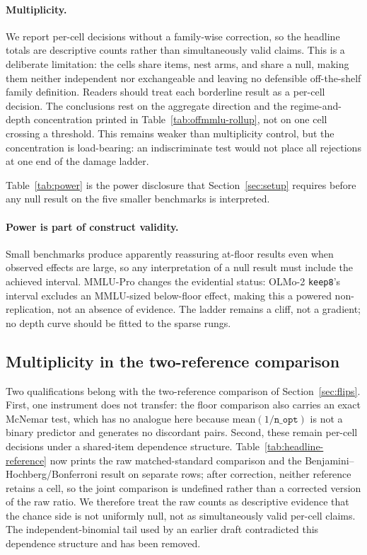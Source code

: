 \paragraph{Multiplicity.} We report per-cell decisions without a family-wise correction, so the headline totals are descriptive counts rather than simultaneously valid claims. This is a deliberate limitation: the cells share items, nest arms, and share a null, making them neither independent nor exchangeable and leaving no defensible off-the-shelf family definition. Readers should treat each borderline result as a per-cell decision. The conclusions rest on the aggregate direction and the regime-and-depth concentration printed in Table~\ref{tab:offmmlu-rollup}, not on one cell crossing a threshold. This remains weaker than multiplicity control, but the concentration is load-bearing: an indiscriminate test would not place all rejections at one end of the damage ladder.

Table~\ref{tab:power} is the power disclosure that Section~\ref{sec:setup} requires before any null result on the five smaller benchmarks is interpreted.



\FloatBarrier

\paragraph{Power is part of construct validity.} Small benchmarks produce apparently reassuring at-floor results even when observed effects are large, so any interpretation of a null result must include the achieved interval. MMLU-Pro changes the evidential status: OLMo-2 \texttt{keep8}'s interval excludes an MMLU-sized below-floor effect, making this a powered non-replication, not an absence of evidence. The ladder remains a cliff, not a gradient; no depth curve should be fitted to the sparse rungs.

\subsection{Multiplicity in the two-reference comparison}
\label{app:analysis-mult}

Two qualifications belong with the two-reference comparison of Section~\ref{sec:flips}. First, one instrument does not transfer: the floor comparison also carries an exact McNemar test, which has no analogue here because $\mathrm{mean}(1/\texttt{n\_opt})$ is not a binary predictor and generates no discordant pairs. Second, these remain per-cell decisions under a shared-item dependence structure. Table~\ref{tab:headline-reference} now prints the raw matched-standard comparison and the Benjamini--Hochberg/Bonferroni result on separate rows; after correction, neither reference retains a cell, so the joint comparison is undefined rather than a corrected version of the raw ratio. We therefore treat the raw counts as descriptive evidence that the chance side is not uniformly null, not as simultaneously valid per-cell claims. The independent-binomial tail used by an earlier draft contradicted this dependence structure and has been removed.

